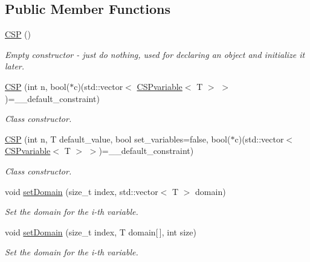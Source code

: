 \subsection*{Public Member Functions}
\begin{DoxyCompactItemize}
\item 
\hypertarget{classCSP_a3a4c1cfab4f5c2376b5f9da588e73f5a}{
\hyperlink{classCSP_a3a4c1cfab4f5c2376b5f9da588e73f5a}{CSP} ()}
\label{classCSP_a3a4c1cfab4f5c2376b5f9da588e73f5a}

\begin{DoxyCompactList}\small\item\em Empty constructor -\/ just do nothing, used for declaring an object and initialize it later. \item\end{DoxyCompactList}\item 
\hyperlink{classCSP_ad49548121582cc2d59e0d7f100092b75}{CSP} (int n, bool($\ast$c)(std::vector$<$ \hyperlink{structCSPvariable}{CSPvariable}$<$ T $>$ $>$)=\_\-\_\-default\_\-constraint)
\begin{DoxyCompactList}\small\item\em Class constructor. \item\end{DoxyCompactList}\item 
\hyperlink{classCSP_a734bb08d8f45394a2acfc8822981a6d0}{CSP} (int n, T default\_\-value, bool set\_\-variables=false, bool($\ast$c)(std::vector$<$ \hyperlink{structCSPvariable}{CSPvariable}$<$ T $>$ $>$)=\_\-\_\-default\_\-constraint)
\begin{DoxyCompactList}\small\item\em Class constructor. \item\end{DoxyCompactList}\item 
void \hyperlink{classCSP_a4017c17aac9d3e96d0e821ebbe09da7b}{setDomain} (size\_\-t index, std::vector$<$ T $>$ domain)
\begin{DoxyCompactList}\small\item\em Set the domain for the i-\/th variable. \item\end{DoxyCompactList}\item 
void \hyperlink{classCSP_a65518e67e33e31bff1b5f9aabdf80a01}{setDomain} (size\_\-t index, T domain\mbox{[}$\,$\mbox{]}, int size)
\begin{DoxyCompactList}\small\item\em Set the domain for the i-\/th variable. \item\end{DoxyCompactList}\item 

\end{DoxyCompactItemize}
